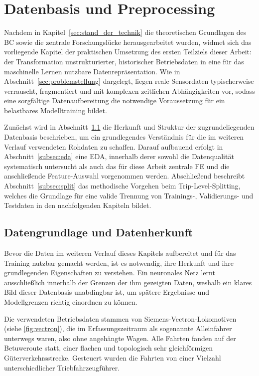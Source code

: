 \section{Datenbasis und Preprocessing}
\label{sec:daten_preprocessing}

Nachdem in Kapitel~\ref{sec:stand_der_technik} die theoretischen Grundlagen des \gls{BC} sowie die zentrale Forschungslücke herausgearbeitet wurden, widmet sich das vorliegende Kapitel der praktischen Umsetzung des ersten Teilziels dieser Arbeit: der Transformation unstrukturierter, historischer Betriebsdaten in eine für das maschinelle Lernen nutzbare Datenrepräsentation. Wie in Abschnitt~\ref{sec:problemstellung} dargelegt, liegen reale Sensordaten typischerweise verrauscht, fragmentiert und mit komplexen zeitlichen Abhängigkeiten vor, sodass eine sorgfältige Datenaufbereitung die notwendige Voraussetzung für ein belastbares Modelltraining bildet.

Zunächst wird in Abschnitt~\ref{subsec:datengrundlage} die Herkunft und Struktur der zugrundeliegenden Datenbasis beschrieben, um ein grundlegendes Verständnis für die im weiteren Verlauf verwendeten Rohdaten zu schaffen. Darauf aufbauend erfolgt in Abschnitt~\ref{subsec:eda} eine \gls{EDA}, innerhalb derer sowohl die Datenqualität systematisch untersucht als auch das für diese Arbeit zentrale \gls{FE} und die anschließende Feature-Auswahl vorgenommen werden. Abschließend beschreibt Abschnitt~\ref{subsec:split} das methodische Vorgehen beim Trip-Level-Splitting, welches die Grundlage für eine valide Trennung von Trainings-, Validierungs- und Testdaten in den nachfolgenden Kapiteln bildet.

\subsection{Datengrundlage und Datenherkunft}
\label{subsec:datengrundlage}

Bevor die Daten im weiteren Verlauf dieses Kapitels aufbereitet und für das Training nutzbar gemacht werden, ist es notwendig, ihre Herkunft und ihre grundlegenden Eigenschaften zu verstehen. Ein neuronales Netz lernt ausschließlich innerhalb der Grenzen der ihm gezeigten Daten, weshalb ein klares Bild dieser Datenbasis unabdingbar ist, um spätere Ergebnisse und Modellgrenzen richtig einordnen zu können.

Die verwendeten Betriebsdaten stammen von Siemens-Vectron-Lokomotiven (siehe \autoref{fig:vectron}), die im Erfassungszeitraum als sogenannte Alleinfahrer unterwegs waren, also ohne angehängte Wagen. Alle Fahrten fanden auf der Betuweroute statt, einer flachen und topologisch sehr gleichförmigen Güterverkehrsstrecke. Gesteuert wurden die Fahrten von einer Vielzahl unterschiedlicher Triebfahrzeugführer.

